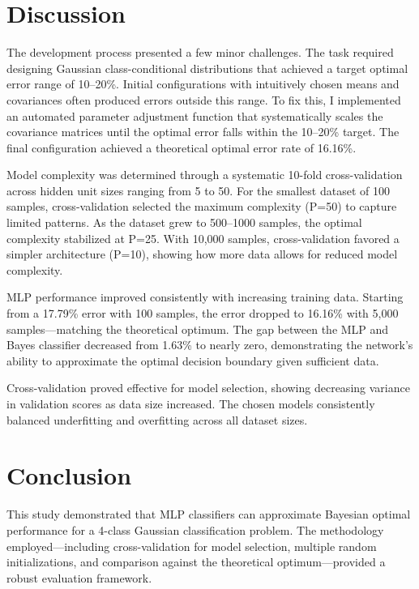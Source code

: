 \documentclass[12pt]{article}
\begin{document}
\section{Discussion}

The development process presented a few minor challenges. The task required designing Gaussian class-conditional distributions that achieved a target optimal error range of 10–20\%. Initial configurations with intuitively chosen means and covariances often produced errors outside this range. To fix this, I implemented an automated parameter adjustment function that systematically scales the covariance matrices until the optimal error falls within the 10–20\% target. The final configuration achieved a theoretical optimal error rate of 16.16\%.

Model complexity was determined through a systematic 10-fold cross-validation across hidden unit sizes ranging from 5 to 50. For the smallest dataset of 100 samples, cross-validation selected the maximum complexity (P=50) to capture limited patterns. As the dataset grew to 500–1000 samples, the optimal complexity stabilized at P=25. With 10,000 samples, cross-validation favored a simpler architecture (P=10), showing how more data allows for reduced model complexity.

MLP performance improved consistently with increasing training data. Starting from a 17.79\% error with 100 samples, the error dropped to 16.16\% with 5,000 samples—matching the theoretical optimum. The gap between the MLP and Bayes classifier decreased from 1.63\% to nearly zero, demonstrating the network’s ability to approximate the optimal decision boundary given sufficient data.

Cross-validation proved effective for model selection, showing decreasing variance in validation scores as data size increased. The chosen models consistently balanced underfitting and overfitting across all dataset sizes.

\section{Conclusion}

This study demonstrated that MLP classifiers can approximate Bayesian optimal performance for a 4-class Gaussian classification problem. The methodology employed—including cross-validation for model selection, multiple random initializations, and comparison against the theoretical optimum—provided a robust evaluation framework.
\end{document}
